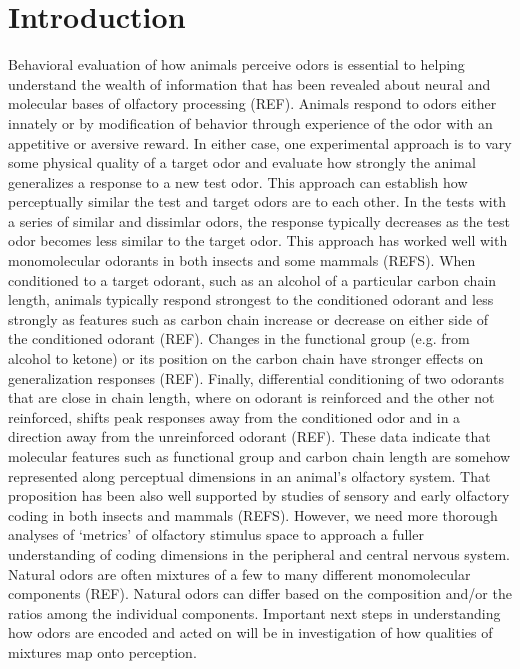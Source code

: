 \section*{Introduction}
\label{sec:introduction}
  
Behavioral evaluation of how animals perceive odors is essential to helping understand the wealth of information that has been revealed about neural and molecular bases of olfactory processing (REF). 
Animals respond to odors either innately or by modification of behavior through experience of the odor with an appetitive or aversive reward. 
In either case, one experimental approach is to vary some physical quality of a target odor and evaluate how strongly the animal generalizes a response to a new test odor. 
This approach can establish how perceptually similar the test and target odors are to each other. 
In the tests with a series of similar and dissimlar odors, the response typically decreases as the test odor becomes less similar to the target odor. 
This approach has worked well with monomolecular odorants in both insects and some mammals (REFS). 
When conditioned to a target odorant, such as an alcohol of a particular carbon chain length, animals typically respond strongest to the conditioned odorant and less strongly as features such as carbon chain increase or decrease on either side of the conditioned odorant (REF). 
Changes in the functional group (e.g. from alcohol to ketone) or its position on the carbon chain have stronger effects on generalization responses (REF). 
Finally, differential conditioning of two odorants that are close in chain length, where on odorant is reinforced and the other not reinforced, shifts peak responses away from the conditioned odor and in a direction away from the unreinforced odorant (REF). 
These data indicate that molecular features such as functional group and carbon chain length are somehow represented along perceptual dimensions in an animal’s olfactory system. 
That proposition has been also well supported by studies of sensory and early olfactory coding in both insects and mammals (REFS). 
 However, we need more thorough analyses of ‘metrics’ of olfactory stimulus space to approach a fuller understanding of coding dimensions in the peripheral and central nervous system. 
 Natural odors are often mixtures of a few to many different monomolecular components (REF). 
 Natural odors can differ based on the composition and/or the ratios among the individual components. 
 Important next steps in understanding how odors are encoded and acted on will be in investigation of how qualities of mixtures map onto perception. 
